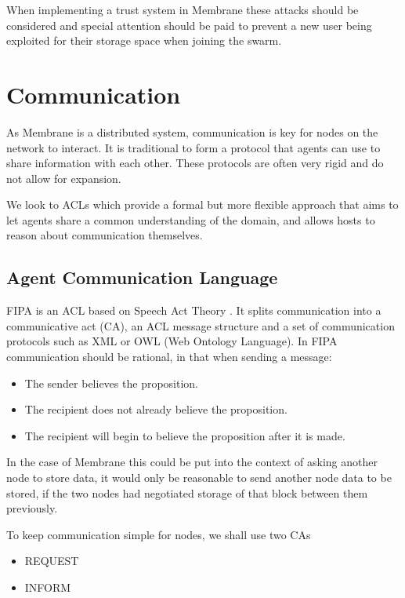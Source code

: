 \documentclass[11pt, a4paper, twoside]{report}
\begin{document}
When implementing a trust system in Membrane these attacks should be considered and special attention should be paid to prevent a new user being exploited for their storage space when joining the swarm.

\section{Communication} \label{sec:comm}

As Membrane is a distributed system, communication is key for nodes on the network to interact. It is traditional to form a protocol that agents can use to share information with each other. These protocols are often very rigid and do not allow for expansion.

We look to ACLs which provide a formal but more flexible approach that aims to let agents share a common understanding of the domain, and allows hosts to reason about communication themselves.

\subsection{Agent Communication Language}

FIPA is an ACL based on Speech Act Theory \citep{labrou1999agent}. It splits communication into a communicative act (CA), an ACL message structure and a set of communication protocols such as XML or OWL (Web Ontology Language). In FIPA communication should be rational, in that when sending a message:

\begin{itemize}
  \item The sender believes the proposition.
  \item The recipient does not already believe the proposition.
  \item The recipient will begin to believe the proposition after it is made.
\end{itemize}

In the case of Membrane this could be put into the context of asking another node to store data, it would only be reasonable to send another node data to be stored, if the two nodes had negotiated storage of that block between them previously.

To keep communication simple for nodes, we shall use two CAs

\begin{itemize}
  \item REQUEST
  \item INFORM
\end{itemize}
\end{document}
